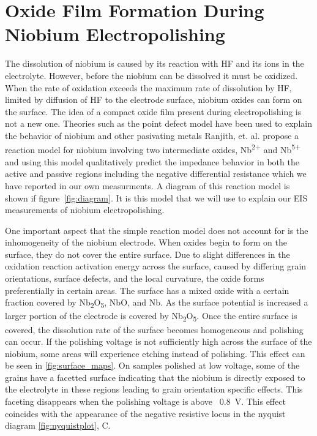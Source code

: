\section{Oxide Film Formation During Niobium Electropolishing}

The dissolution of niobium is caused by its reaction with HF and its ions in the electrolyte. However, before the niobium can be dissolved it must be oxidized. When the rate of oxidation exceeds the maximum rate of dissolution by HF, limited by diffusion of HF to the electrode surface, niobium oxides can form on the surface. The idea of a compact oxide film present during electropolishing is not a new one.\cite{Tian_2008,tian2008novel} Theories such as the point defect model have been used to explain the behavior of niobium and other pasivating metals\cite{bojinov1997ability, girginov2008conduction, bojinov2003evidence, macdonald1990theory, macdonald1992steady} Ranjith, et. al.\cite{ranjith2018anodic} propose a reaction model for niobium involving two intermediate oxides, Nb\textsuperscript{2+} and Nb\textsuperscript{5+} and using this model qualitatively predict the impedance behavior in both the active and passive regions including the negative differential resistance which we have reported in our own measurments. A diagram of this reaction model is shown if figure~\ref{fig:diagram}. It is this model that we will use to explain our EIS measurements of niobium electropolishing.

One important aspect that the simple reaction model does not account for is the inhomogeneity of the niobium electrode. When oxides begin to form on the surface, they do not cover the entire surface. Due to slight differences in the oxidation reaction activation energy across the surface, caused by differing grain orientations, surface defects, and the local curvature, the oxide forms preferentially in certain areas. The surface has a mixed oxide with a certain fraction covered by Nb\textsubscript{2}O\textsubscript{5}, NbO, and Nb. As the surface potential is increased a larger portion of the electrode is covered by Nb\textsubscript{2}O\textsubscript{5}. Once the entire surface is covered, the dissolution rate of the surface becomes homogeneous and polishing can occur. If the polishing voltage is not sufficiently high across the surface of the niobium, some areas will experience etching instead of polishing. This effect can be seen in \ref{fig:surface_maps}. On samples polished at low voltage, some of the grains have a facetted surface indicating that the niobium is directly exposed to the electrolyte in these regions leading to grain orientation specific effects. This faceting disappears when the polishing voltage is above ~\qty{0.8}{\volt}. This effect coincides with the appearance of the negative resistive locus in the nyquist diagram \ref{fig:nyquistplot}, C.


